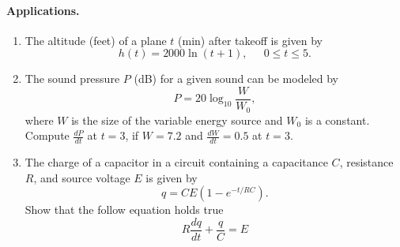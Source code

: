 \documentclass{article}
\begin{document}
\newpage

\paragraph*{Applications.}
\begin{enumerate}
\item	The altitude (feet) of a plane $t$ (min) after takeoff is given by
\[
h(t)=2000\ln(t+1),~\quad~0\leq t\leq 5.
\]

\vspace*{10em}

\item	The sound pressure $P$ (dB) for a given sound can be modeled by
\[
P=20\log_{10}\frac{W}{W_{0}},
\]
where $W$ is the size of the variable energy source and $W_{0}$ is a constant. 
Compute $\frac{dP}{dt}$ at $t=3$, if $W=7.2$ and $\frac{dW}{dt}=0.5$ at $t=3$. 

\vspace*{10em}

\item	The charge of a capacitor in a circuit containing a capacitance $C$, resistance $R$, and source voltage $E$ is given by
\[
q=CE\left(1-e^{-t/RC}\right).
\]
Show that the follow equation holds true
\[
R\frac{dq}{dt}+\frac{q}{C}=E
\]
\end{enumerate}
\end{document}
